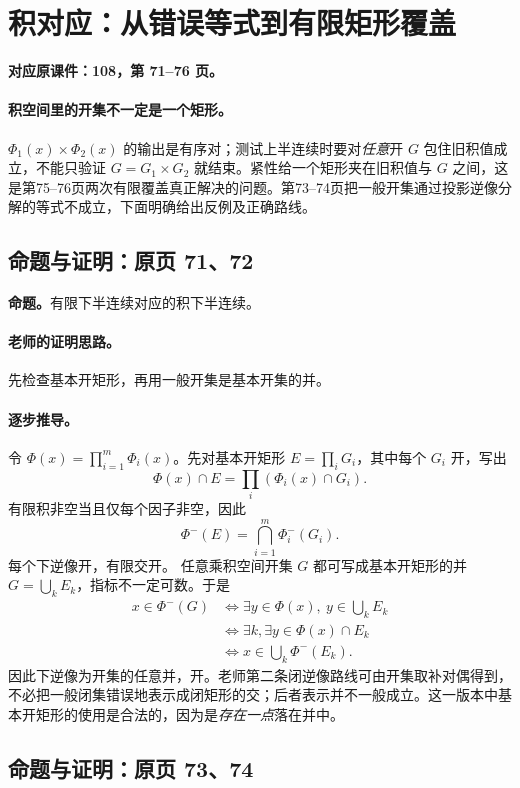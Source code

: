 \clearpage\section{积对应：从错误等式到有限矩形覆盖}\label{g:108:71}

\textbf{对应原课件：108，第 71--76 页。}


\paragraph{积空间里的开集不一定是一个矩形。}
$\Phi_1(x)\times\Phi_2(x)$ 的输出是有序对；测试上半连续时要对\emph{任意}开 $G$ 包住旧积值成立，不能只验证 $G=G_1\times G_2$ 就结束。紧性给一个矩形夹在旧积值与 $G$ 之间，这是第75--76页两次有限覆盖真正解决的问题。第73--74页把一般开集通过投影逆像分解的等式不成立，下面明确给出反例及正确路线。


\subsection{命题与证明：原页 71、72}

\textbf{命题。}有限下半连续对应的积下半连续。

\paragraph{老师的证明思路。}先检查基本开矩形，再用一般开集是基本开集的并。

\paragraph{逐步推导。}
令 $\Phi(x)=\prod_{i=1}^m\Phi_i(x)$。先对基本开矩形 $E=\prod_iG_i$，其中每个 $G_i$ 开，写出
\[\Phi(x)\cap E=\prod_i(\Phi_i(x)\cap G_i).\]
有限积非空当且仅每个因子非空，因此
\[\Phi^-(E)=\bigcap_{i=1}^m\Phi_i^-(G_i).\]
每个下逆像开，有限交开。
任意乘积空间开集 $G$ 都可写成基本开矩形的并 $G=\bigcup_kE_k$，指标不一定可数。于是
\begin{align*}
x\in\Phi^-(G)&\iff\exists y\in\Phi(x),\ y\in\bigcup_kE_k\\
&\iff\exists k,\exists y\in\Phi(x)\cap E_k\\
&\iff x\in\bigcup_k\Phi^-(E_k).
\end{align*}
因此下逆像为开集的任意并，开。老师第二条闭逆像路线可由开集取补对偶得到，不必把一般闭集错误地表示成闭矩形的交；后者表示并不一般成立。这一版本中基本开矩形的使用是合法的，因为是\emph{存在一点}落在并中。


\subsection{命题与证明：原页 73、74}

